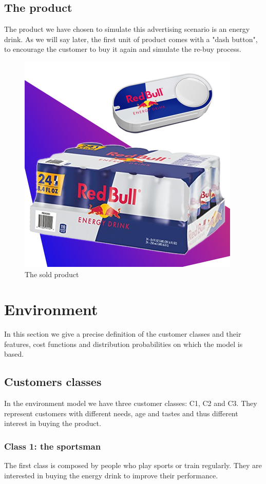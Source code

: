 \documentclass[12pt,a4paper]{report}
\begin{document}
\section{The product}
The product we have chosen to simulate this advertising scenario is an energy drink. As we will say later, the first unit of product comes with a "dash button", to encourage the customer to buy it again and simulate the re-buy process.
\begin{figure}[H]
\centering
  \includegraphics[scale = 0.7, center]{redbull-dash}
  \caption{The sold product}
\end{figure}

	\chapter{Environment}		
In this section we give a precise definition of the customer classes and their features, cost functions and distribution probabilities on which the model is based.

		\section{Customers classes}
In the environment model we have three customer classes: C1, C2 and C3.
They represent customers with different needs, age and tastes and thus different interest in buying the product.

			\subsection{Class 1: the sportsman}
The first class is composed by people who play sports or train regularly. They are interested in buying the energy drink to improve their performance. 
\end{document}
